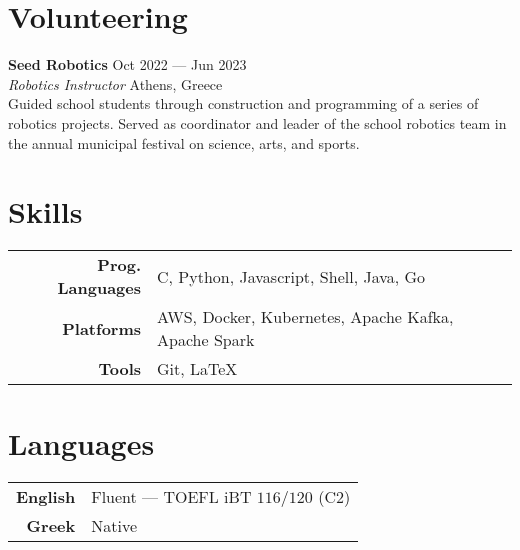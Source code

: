 \documentclass[margin, 12pt]{resume}
\newcommand{\competition}[1]{\textbf{#1}\xspace}
\newcommand{\institution}[1]{\textbf{#1}\xspace}
\newcommand{\role}[1]{\textit{#1}\xspace}
\begin{document}
\begin{resume}
\section{Volunteering}

\institution{Seed Robotics} \hfill Oct 2022 --- Jun 2023 \\
\role{Robotics Instructor} \hfill Athens, Greece \\
Guided school students through construction and programming of a series of robotics projects. Served as coordinator and leader of the school robotics team in the annual municipal festival on science, arts, and sports.
 
\section{Skills}

\begin{tabular}{@{} >{\bfseries}r l @{}}
    Prog. Languages & C, Python, Javascript, Shell, Java, Go              \\
    Platforms & AWS, Docker, Kubernetes, Apache Kafka, Apache Spark \\
    Tools & Git, LaTeX
\end{tabular}

\section{Languages}

\begin{tabular}{@{} >{\bfseries}r l @{}}
    English & Fluent --- TOEFL iBT \( 116/120 \) (C2) \\
    Greek & Native \\ 
\end{tabular}





\end{resume}
\end{document}
